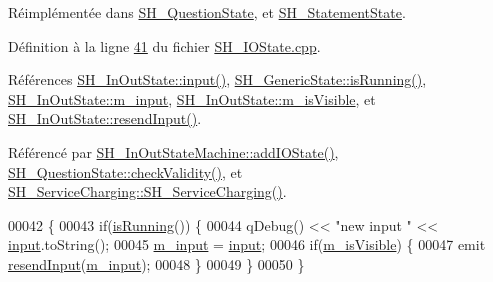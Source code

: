 Réimplémentée dans \hyperlink{classSH__QuestionState_ab40b6202090d1afcc965e124b2deb88a}{S\-H\-\_\-\-Question\-State}, et \hyperlink{classSH__StatementState_ac9d6483521908224e4cb3765d680d113}{S\-H\-\_\-\-Statement\-State}.



Définition à la ligne \hyperlink{SH__IOState_8cpp_source_l00041}{41} du fichier \hyperlink{SH__IOState_8cpp_source}{S\-H\-\_\-\-I\-O\-State.\-cpp}.



Références \hyperlink{classSH__InOutState_a8e1b78069343122df7713624a1a5a100}{S\-H\-\_\-\-In\-Out\-State\-::input()}, \hyperlink{classSH__GenericState_a5f731810dad0cacd28828ccbf1539e4e}{S\-H\-\_\-\-Generic\-State\-::is\-Running()}, \hyperlink{classSH__InOutState_ae43d6fdc62047f285913837648a1e883}{S\-H\-\_\-\-In\-Out\-State\-::m\-\_\-input}, \hyperlink{classSH__InOutState_a8fd66b185c9a55f0e84daa97e2acf53a}{S\-H\-\_\-\-In\-Out\-State\-::m\-\_\-is\-Visible}, et \hyperlink{classSH__InOutState_a1f00480afefd173002cf56d4c4128048}{S\-H\-\_\-\-In\-Out\-State\-::resend\-Input()}.



Référencé par \hyperlink{classSH__InOutStateMachine_a2528cffddbe6f98c32ebef41423c0118}{S\-H\-\_\-\-In\-Out\-State\-Machine\-::add\-I\-O\-State()}, \hyperlink{classSH__QuestionState_a902be003650c33d954d707b2d3ee0bb9}{S\-H\-\_\-\-Question\-State\-::check\-Validity()}, et \hyperlink{classSH__ServiceCharging_afa5273d046049b1c2b020a6a19a8290b}{S\-H\-\_\-\-Service\-Charging\-::\-S\-H\-\_\-\-Service\-Charging()}.


\begin{DoxyCode}
00042 \{
00043     \textcolor{keywordflow}{if}(\hyperlink{classSH__GenericState_a5f731810dad0cacd28828ccbf1539e4e}{isRunning}()) \{
00044         qDebug() << \textcolor{stringliteral}{"new input "} << \hyperlink{classSH__InOutState_a8e1b78069343122df7713624a1a5a100}{input}.toString();
00045         \hyperlink{classSH__InOutState_ae43d6fdc62047f285913837648a1e883}{m\_input} = \hyperlink{classSH__InOutState_a8e1b78069343122df7713624a1a5a100}{input};
00046         \textcolor{keywordflow}{if}(\hyperlink{classSH__InOutState_a8fd66b185c9a55f0e84daa97e2acf53a}{m\_isVisible}) \{
00047             emit \hyperlink{classSH__InOutState_a1f00480afefd173002cf56d4c4128048}{resendInput}(\hyperlink{classSH__InOutState_ae43d6fdc62047f285913837648a1e883}{m\_input});
00048         \}
00049     \}
00050 \}
\end{DoxyCode}


